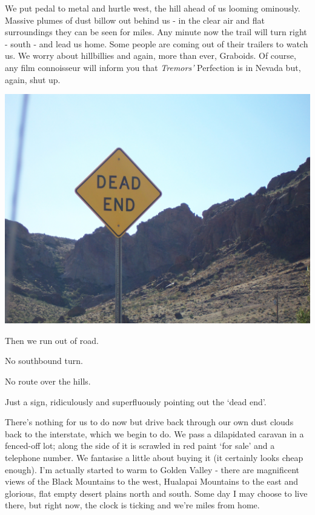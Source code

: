 \documentclass[a5paper,titlepage,11pt,draft]{book}
\begin{document}
We put pedal to metal and hurtle west, the hill ahead of us looming ominously.  Massive plumes of dust billow out behind us - in the clear air and flat surroundings they can be seen for miles.  Any minute now the trail will turn right - south - and lead us home.  Some people are coming out of their trailers to watch us.  We worry about hillbillies and again, more than ever, Graboids.  Of course, any film connoisseur will inform you that \emph{Tremors'} Perfection is in Nevada but, again, shut up.

\begin{center}\includegraphics[width=\textwidth]{gfx/100_1536}\end{center}

Then we run out of road.

No southbound turn.

No route over the hills.

Just a sign, ridiculously and superfluously pointing out the `dead end'.

There's nothing for us to do now but drive back through our own dust clouds back to the interstate, which we begin to do.  We pass a dilapidated caravan in a fenced-off lot; along the side of it is scrawled in red paint `for sale' and a telephone number.  We fantasise a little about buying it (it certainly looks cheap enough).  I'm actually started to warm to Golden Valley - there are magnificent views of the Black Mountains to the west, Hualapai Mountains to the east and glorious, flat empty desert plains north and south.  Some day I may choose to live there, but right now, the clock is ticking and we're miles from home.
\end{document}
